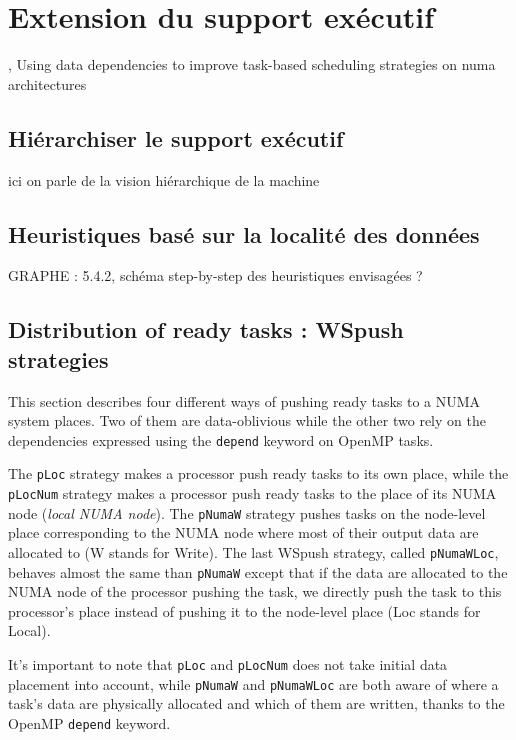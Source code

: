 \section{Extension du support exécutif}\label{sec:openmp:runtime}

\cite{Virouleau2016b}, Using data dependencies to improve task-based scheduling strategies on numa architectures

\subsection{Hiérarchiser le support exécutif}

ici on parle de la vision hiérarchique de la machine


\subsection{Heuristiques basé sur la localité des données}\label{sec:contrib:ws:heuristics}

GRAPHE : 5.4.2, schéma step-by-step des heuristiques envisagées ?

\subsection{Distribution of ready tasks : WSpush strategies}

This section describes four different ways of pushing ready tasks to a NUMA system places.
Two of them are data-oblivious while the other two rely on the dependencies expressed using the \verb!depend! keyword on OpenMP tasks.

The \verb/pLoc/ strategy makes a processor push ready tasks to
    its own place, while the \verb/pLocNum/ strategy makes a processor push ready tasks to the place of its NUMA node (\emph{local NUMA node}).
The \verb/pNumaW/ strategy pushes tasks on the node-level place corresponding to the NUMA node where most of their output data are allocated to (W stands for Write).
The last WSpush strategy, called \verb/pNumaWLoc/, behaves almost the same than \verb!pNumaW! except that if
    the data are allocated to the NUMA node of the processor pushing the task, we directly push the task to this processor's place instead of pushing it to the node-level place (Loc stands for Local).
    
It's important to note that \verb!pLoc! and \verb!pLocNum! does not take initial data placement into account, while \verb!pNumaW! and \verb!pNumaWLoc! are both aware of where a task's data are physically allocated and which of them are written, thanks to the OpenMP \verb!depend! keyword.

